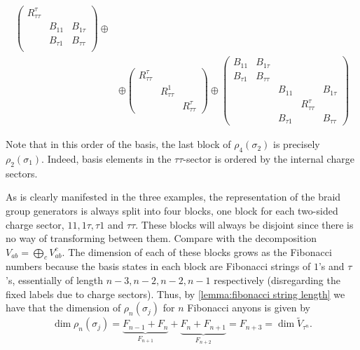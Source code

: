 \begin{example}
\begin{equation}
\begin{aligned}
\begin{pmatrix}
        R_{ττ}^τ \\
        & B_{11} & B_{1τ} \\
        & B_{τ1} & B_{ττ} \\
      \end{pmatrix}
      \oplus \\
      & \oplus
      \begin{pmatrix}
        R_{ττ}^τ \\
        & R_{ττ}^1 \\
        & & R_{ττ}^τ
      \end{pmatrix}
      \oplus
      \begin{pmatrix}
        B_{11} & B_{1τ} \\
        B_{τ1} & B_{ττ} \\
        & & B_{11} & & B_{1τ} \\
        & & & R_{ττ}^τ \\
        & & B_{τ1} & & B_{ττ}
      \end{pmatrix}
    \end{aligned}
  \end{equation}

  Note that in this order of the basis, the last block of $ρ_{4}(σ_2)$ is precisely $ρ_2(σ_1)$. Indeed, basis elements in the $ττ$-sector is ordered by the internal charge sectors.
\end{example}

\begin{remark}\label{remark:fibonacci sigma dimension}
  As is clearly manifested in the three examples, the representation of the braid group generators is always split into four blocks, one block for each two-sided charge sector, $11, 1τ, τ1$ and $ττ$. These blocks will always be disjoint since there is no way of transforming between them. Compare with the decomposition $V_{ab} = \bigoplus_c V_{ab}^c$. The dimension of each of these blocks grows as the Fibonacci numbers because the basis states in each block are Fibonacci strings of $1$'s and $τ$'s, essentially of length $n-3, n-2, n-2, n-1$ respectively (disregarding the fixed labels due to charge sectors). Thus, by \cref{lemma:fibonacci string length} we have that the dimension of $ρ_n(σ_j)$ for $n$ Fibonacci anyons is given by
  \begin{equation}
    \operatorname{dim} ρ_n (σ_j) = \underbrace{F_{n-1} + F_{n}}_{F_{n+1}} + \underbrace{F_{n} + F_{n+1}}_{F_{n+2}} = F_{n+3} = \dim \widetilde{V}_{\tau^n}.
  \end{equation}
\end{remark}

